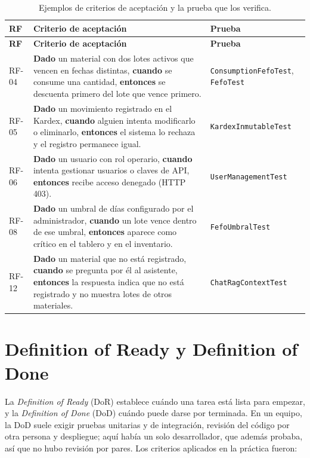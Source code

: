 \begin{longtable}{|p{1.4cm}|p{9.6cm}|p{3.6cm}|}
\caption{Ejemplos de criterios de aceptación y la prueba que los verifica.}
\label{tab:ges_criterios}\\
\hline
\textbf{RF} & \textbf{Criterio de aceptación} & \textbf{Prueba} \\
\hline
\endfirsthead
\hline
\textbf{RF} & \textbf{Criterio de aceptación} & \textbf{Prueba} \\
\hline
\endhead
RF-04 & \textbf{Dado} un material con dos lotes activos que vencen en fechas distintas, \textbf{cuando} se consume una cantidad, \textbf{entonces} se descuenta primero del lote que vence primero. & \texttt{ConsumptionFefoTest}, \texttt{FefoTest} \\ \hline
RF-05 & \textbf{Dado} un movimiento registrado en el Kardex, \textbf{cuando} alguien intenta modificarlo o eliminarlo, \textbf{entonces} el sistema lo rechaza y el registro permanece igual. & \texttt{KardexInmutableTest} \\ \hline
RF-06 & \textbf{Dado} un usuario con rol operario, \textbf{cuando} intenta gestionar usuarios o claves de API, \textbf{entonces} recibe acceso denegado (HTTP 403). & \texttt{UserManagementTest} \\ \hline
RF-08 & \textbf{Dado} un umbral de días configurado por el administrador, \textbf{cuando} un lote vence dentro de ese umbral, \textbf{entonces} aparece como crítico en el tablero y en el inventario. & \texttt{FefoUmbralTest} \\ \hline
RF-12 & \textbf{Dado} un material que no está registrado, \textbf{cuando} se pregunta por él al asistente, \textbf{entonces} la respuesta indica que no está registrado y no muestra lotes de otros materiales. & \texttt{ChatRagContextTest} \\ \hline
\end{longtable}

\section{Definition of Ready y Definition of Done}
\label{sec:ges_dor_dod}

La \textit{Definition of Ready} (DoR) establece cuándo una tarea está lista para empezar, y la \textit{Definition of Done} (DoD) cuándo puede darse por terminada. En un equipo, la DoD suele exigir pruebas unitarias y de integración, revisión del código por otra persona y despliegue; aquí había un solo desarrollador, que además probaba, así que no hubo revisión por pares. Los criterios aplicados en la práctica fueron:

